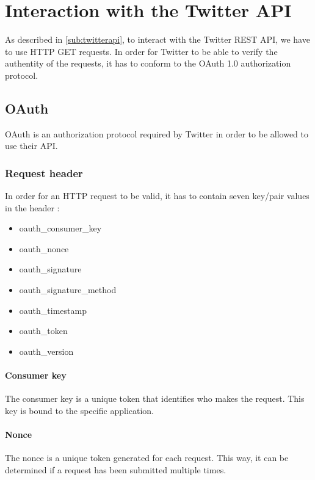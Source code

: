 \chapter{Interaction with the Twitter \ac{API}}\label{cha:twitterAPI}
As described in \autoref{sub:twitterapi}, to interact with the Twitter
\ac{REST} \ac{API}, we have to use \ac{HTTP} GET requests. In order for
Twitter to be able to verify the authentity of the requests, it has to conform
to the OAuth 1.0 authorization protocol.
\section{OAuth}
OAuth is an authorization protocol required by Twitter in order to be allowed to
use their \ac{API}.

\subsection{Request header}
In order for an \ac{HTTP} request to be valid, it has to
contain seven key/pair values in the header \citep{TwitterAPIAuth}:
\begin{itemize}
  \item oauth\_consumer\_key
  \item oauth\_nonce
  \item oauth\_signature
  \item oauth\_signature\_method
  \item oauth\_timestamp
  \item oauth\_token
  \item oauth\_version
\end{itemize}

\subsubsection*{Consumer key}
The consumer key is a unique token that identifies who makes the request.
This key is bound to the specific application.

\subsubsection*{Nonce}
The nonce is a unique token generated for each request. This way, it can be
determined if a request has been submitted multiple times. 

